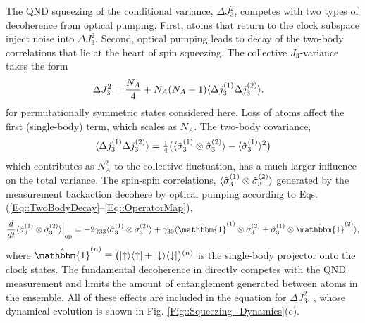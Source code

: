 \documentclass[preprint, aps,pra,onecolumn]{revtex4-1} %
\newcommand{\half}{\smallfrac{1}{2}}
\newcommand{\varz}{\Delta J_3^2}
\newcommand{\jz}{\hat{J}_3}
\begin{document}
The QND squeezing of the conditional variance, $\varz$, competes with two types of decoherence from optical pumping.
First, atoms that return to the clock subspace inject noise into $\varz$.  
Second, optical pumping leads to decay of the two-body correlations that lie at the heart of spin squeezing.  
The collective $J_3$-variance takes the form
	\begin{align}
		\varz & = \frac{N_A}{4} + N_A(N_A-1) \expt{ \Delta j_3^{(1)} \Delta j_3^{(2)} }.
	\end{align}
for permutationally symmetric states considered here. 
Loss of atoms 
affect the first (single-body) term, which scales as $N_A$. The two-body covariance,
	\begin{align}
		\langle{ \Delta j_3^{(1)} \Delta j_3^{(2)} }\rangle = \mbox{$\frac{1}{4}$} \big( \langle{ \hat{\sigma}_3^{(1)} \otimes \hat{\sigma}_3^{(2)}  }\rangle - \langle{\hat{\sigma}_3^{(1)} }\rangle^2  \big)
	\end{align}
which contributes as $N_A^2$ to the collective fluctuation, has a much larger influence on the total variance. 
The spin-spin correlations, $\langle{ \hat{\sigma}_3^{(1)} \otimes \hat{\sigma}_3^{(2)} }\rangle$ generated by the measurement backaction decohere by optical pumping according to Eqs. (\ref{Eq::TwoBodyDecay}--\ref{Eq::OperatorMap}),
	\begin{align} \label{Eq::TwoBodySpinDecay}
		\frac{d}{dt} \expt{\hat{\sigma}_3^{(1)} \otimes \hat{\sigma}_3^{(2)} }  \Big|_{\rm op} = - 2 \gamma_{33}  \expt{\hat{\sigma}_3^{(1)} \otimes \hat{\sigma}_3^{(2)}} + \gamma_{30} \expt{ \hat{\mathbbm{1}}^{(1)} \otimes \hat{\sigma}_3^{(2)} + \hat{\sigma}_3^{(1)} \otimes \hat{\mathbbm{1}}^{(2)} },
	\end{align}
where $\hat{\mathbbm{1}}^{(n)} \equiv \big( \op{\uparrow}{\uparrow} + \op{\downarrow}{\downarrow} \big){}^{(n)}$ is the single-body projector onto the clock states. 
The fundamental decoherence in  directly competes with the QND measurement and limits the amount of entanglement generated between atoms in the ensemble.  
All of these effects are included in the equation for $\varz$, , whose dynamical evolution is shown in Fig. \ref{Fig::Squeezing_Dynamics}(c). 
\end{document}
